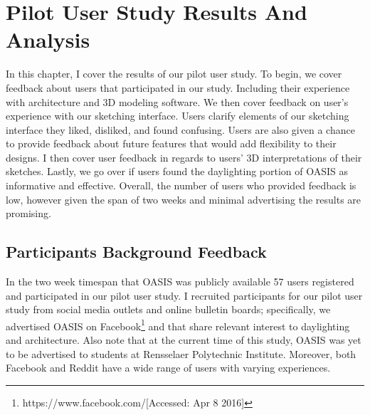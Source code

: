 \chapter{Pilot User Study Results And Analysis} \label{sec:results}
In this chapter,  I cover the results of our pilot user study.
To begin, we cover feedback  about users that participated in our study.
Including their experience with architecture and 3D modeling software.
We then cover feedback on user's experience with our sketching interface.
Users clarify elements of  our sketching interface they liked, disliked, and found confusing.  
Users are also given a chance to provide feedback about future features that would add flexibility to their designs.
I then cover user feedback in regards to users' 3D interpretations of their sketches.
Lastly, we go over if users found the daylighting portion of OASIS as informative and effective.
Overall, the number of users who provided feedback is low, however given the span of two weeks and minimal advertising the results are promising.



\section{Participants Background Feedback}

In the two week timespan that OASIS was publicly available 57 users registered and participated in our pilot user study.
I recruited participants for our pilot user study from social media outlets and online bulletin boards; specifically, we advertised OASIS on Facebook\footnote{https://www.facebook.com/[Accessed: Apr 8 2016]} and that share relevant interest to daylighting and architecture. Also note that at the  current time of this study, OASIS was yet to be advertised to students at Rensselaer Polytechnic Institute. Moreover, both Facebook and Reddit have a wide range of users with varying experiences.

